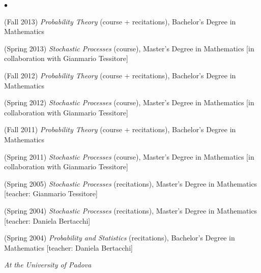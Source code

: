 \documentclass[a4paper,11pt,oneside]{amsart}
\newenvironment{myitemize}{%
\begin{list}{$\bullet$}%
 	{%
	\setlength{\itemsep}{0.3em}%
	\setlength{\topsep}{0.3em}%
	\setlength{\partopsep}{0em}%
	\setlength{\parsep}{0em}%
	\setlength{\parskip}{0em}%
	\setlength\leftmargin{1.5em}%
	\setlength\labelwidth{1.1em}%
	\setlength{\labelsep}{0.4em}%
	}%
	}%
{\end{list}}
\renewenvironment{itemize}{
\begin{myitemize}}%
{\end{myitemize}}
\begin{document}
\begin{itemize}
\item (Fall 2013)
\textit{Probability Theory} (course + recitations),
Bachelor's Degree in Mathematics

\item (Spring 2013)
\textit{Stochastic Processes} (course),
Master's Degree in Mathematics
[in collaboration with Gianmario Tessitore]


\item (Fall 2012)
\textit{Probability Theory} (course + recitations),
Bachelor's Degree in Mathematics


\item (Spring 2012)
\textit{Stochastic Processes} (course),
Master's Degree in Mathematics
[in collaboration with Gianmario Tessitore]

\item (Fall 2011)
\textit{Probability Theory} (course + recitations),
Bachelor's Degree in Mathematics

\item (Spring 2011)
\textit{Stochastic Processes} (course),
Master's Degree in Mathematics
[in collaboration with Gianmario Tessitore]

\item (Spring 2005)
\emph{Stochastic Processes} (recitations),
Master's Degree in Mathematics 
[teacher: Gianmario Tessitore]

\item (Spring 2004)
\emph{Stochastic Processes} (recitations),
Master's Degree in Mathematics 
[teacher: Daniela Bertacchi]

\item (Spring 2004)
\emph{Probability and Statistics} (recitations),
Bachelor's Degree in Mathematics 
[teacher: Daniela Bertacchi]
\end{itemize}


\smallskip
\emph{At the University of Padova}
\end{document}
